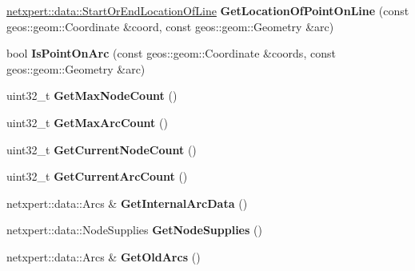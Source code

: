 \begin{DoxyCompactItemize}
\item 
\hyperlink{namespacenetxpert_1_1data_ad00da8a39753bf6c4a99669e8fe4c6b5}{netxpert\+::data\+::\+Start\+Or\+End\+Location\+Of\+Line} {\bfseries Get\+Location\+Of\+Point\+On\+Line} (const geos\+::geom\+::\+Coordinate \&coord, const geos\+::geom\+::\+Geometry \&arc)\hypertarget{classnetxpert_1_1Network_a97d69be79cf875881acdd9fed6bc64a0}{}\label{classnetxpert_1_1Network_a97d69be79cf875881acdd9fed6bc64a0}

\item 
bool {\bfseries Is\+Point\+On\+Arc} (const geos\+::geom\+::\+Coordinate \&coords, const geos\+::geom\+::\+Geometry \&arc)\hypertarget{classnetxpert_1_1Network_a327fb1a03682a04459afa65b0d610174}{}\label{classnetxpert_1_1Network_a327fb1a03682a04459afa65b0d610174}

\item 
uint32\+\_\+t {\bfseries Get\+Max\+Node\+Count} ()\hypertarget{classnetxpert_1_1Network_ad2fe66df5c9e8d9f9edf83ca4714869a}{}\label{classnetxpert_1_1Network_ad2fe66df5c9e8d9f9edf83ca4714869a}

\item 
uint32\+\_\+t {\bfseries Get\+Max\+Arc\+Count} ()\hypertarget{classnetxpert_1_1Network_aeac0ff68b210ee65f86fb897823b7665}{}\label{classnetxpert_1_1Network_aeac0ff68b210ee65f86fb897823b7665}

\item 
uint32\+\_\+t {\bfseries Get\+Current\+Node\+Count} ()\hypertarget{classnetxpert_1_1Network_abf5757206c34253f4b3f445a8eebac0c}{}\label{classnetxpert_1_1Network_abf5757206c34253f4b3f445a8eebac0c}

\item 
uint32\+\_\+t {\bfseries Get\+Current\+Arc\+Count} ()\hypertarget{classnetxpert_1_1Network_a3d6c66c931140a9ba8872a1b3959d91e}{}\label{classnetxpert_1_1Network_a3d6c66c931140a9ba8872a1b3959d91e}

\item 
netxpert\+::data\+::\+Arcs \& {\bfseries Get\+Internal\+Arc\+Data} ()\hypertarget{classnetxpert_1_1Network_a423034a273fea20d55842bd2f7c3c583}{}\label{classnetxpert_1_1Network_a423034a273fea20d55842bd2f7c3c583}

\item 
netxpert\+::data\+::\+Node\+Supplies {\bfseries Get\+Node\+Supplies} ()\hypertarget{classnetxpert_1_1Network_ad82246ee6aea382eecb3b1dd5371dbcc}{}\label{classnetxpert_1_1Network_ad82246ee6aea382eecb3b1dd5371dbcc}

\item 
netxpert\+::data\+::\+Arcs \& {\bfseries Get\+Old\+Arcs} ()\hypertarget{classnetxpert_1_1Network_afcbd452482c514bcbdf6b65623815bcb}{}\label{classnetxpert_1_1Network_afcbd452482c514bcbdf6b65623815bcb}


\end{DoxyCompactItemize}
